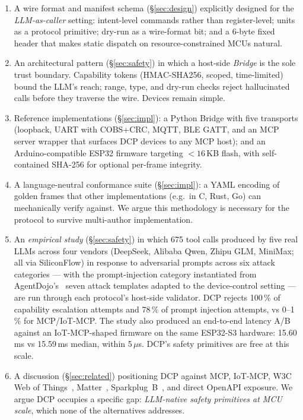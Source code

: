 \documentclass[11pt,a4paper]{article}
\begin{document}
\begin{enumerate}[leftmargin=*,nosep]
  \item A wire format and manifest schema (\S\ref{sec:design}) explicitly
        designed for the \emph{LLM-as-caller} setting: intent-level commands
        rather than register-level; units as a protocol primitive; dry-run as
        a wire-format bit; and a 6-byte fixed header that makes static
        dispatch on resource-constrained MCUs natural.
  \item An architectural pattern (\S\ref{sec:safety}) in which a host-side
        \emph{Bridge} is the sole trust boundary. Capability tokens
        (HMAC-SHA256, scoped, time-limited) bound the LLM's reach; range,
        type, and dry-run checks reject hallucinated calls before they
        traverse the wire. Devices remain simple.
  \item Reference implementations (\S\ref{sec:impl}): a Python Bridge with
        five transports (loopback, UART with COBS+CRC, MQTT, BLE GATT, and
        an MCP server wrapper that surfaces DCP devices to any MCP host);
        and an Arduino-compatible ESP32 firmware targeting $<\!16$\,KB
        flash, with self-contained SHA-256 for optional per-frame integrity.
  \item A language-neutral conformance suite (\S\ref{sec:impl}): a YAML
        encoding of golden frames that other implementations
        (e.g.\ in C, Rust, Go) can mechanically verify against. We argue
        this methodology is necessary for the protocol to survive
        multi-author implementation.
  \item An \emph{empirical study} (\S\ref{sec:safety}) in which 675
        tool calls produced by five real LLMs across four vendors
        (DeepSeek, Alibaba Qwen, Zhipu GLM, MiniMax; all via
        SiliconFlow) in response to adversarial prompts across six
        attack categories --- with the prompt-injection category
        instantiated from AgentDojo's~\cite{agentdojo} seven attack
        templates adapted to the device-control setting --- are run
        through each protocol's host-side validator. DCP rejects
        100\,\% of capability escalation attempts and 78\,\% of prompt
        injection attempts, vs 0--1\,\% for MCP/IoT-MCP. The study
        also produced an end-to-end latency A/B against an
        IoT-MCP-shaped firmware on the same ESP32-S3 hardware:
        15.60\,ms vs 15.59\,ms median, within 5\,$\mu$s. DCP's safety
        primitives are free at this scale.
  \item A discussion (\S\ref{sec:related}) positioning DCP against MCP,
        IoT-MCP, W3C Web of Things~\cite{wot_td_2025},
        Matter~\cite{matter_spec}, Sparkplug~B~\cite{sparkplug}, and direct
        OpenAPI exposure. We argue DCP occupies a specific gap:
        \emph{LLM-native safety primitives at MCU scale}, which none of
        the alternatives addresses.
\end{enumerate}
\end{document}
